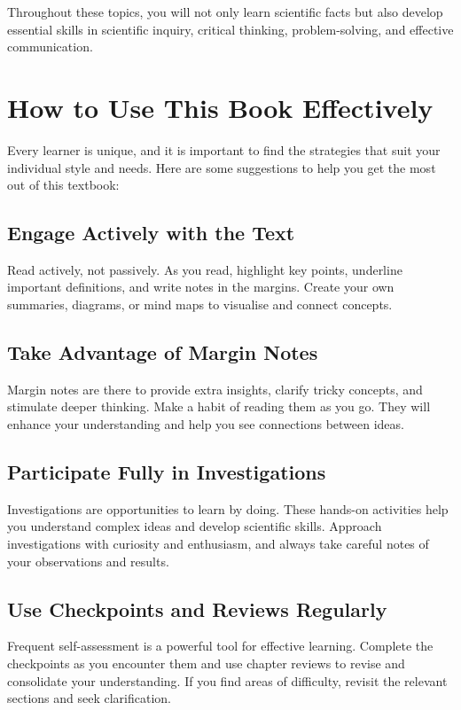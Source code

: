 Throughout these topics, you will not only learn scientific facts but also develop essential skills in scientific inquiry, critical thinking, problem-solving, and effective communication.

\section{How to Use This Book Effectively}

Every learner is unique, and it is important to find the strategies that suit your individual style and needs. Here are some suggestions to help you get the most out of this textbook:

\subsection{Engage Actively with the Text}

Read actively, not passively. As you read, highlight key points, underline important definitions, and write notes in the margins. Create your own summaries, diagrams, or mind maps to visualise and connect concepts.

\subsection{Take Advantage of Margin Notes}

Margin notes are there to provide extra insights, clarify tricky concepts, and stimulate deeper thinking. Make a habit of reading them as you go. They will enhance your understanding and help you see connections between ideas.

\subsection{Participate Fully in Investigations}

Investigations are opportunities to learn by doing. These hands-on activities help you understand complex ideas and develop scientific skills. Approach investigations with curiosity and enthusiasm, and always take careful notes of your observations and results.

\subsection{Use Checkpoints and Reviews Regularly}

Frequent self-assessment is a powerful tool for effective learning. Complete the checkpoints as you encounter them and use chapter reviews to revise and consolidate your understanding. If you find areas of difficulty, revisit the relevant sections and seek clarification.

